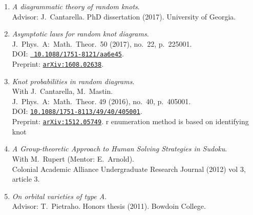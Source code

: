 \documentclass[letterpaper]{article}
\begin{document}
\begin{enumerate}
\item \emph{A diagrammatic theory of random knots}. \\
  Advisor: J.\ Cantarella. PhD dissertation (2017). University of Georgia.
\item \emph{Asymptotic laws for random knot diagrams}. \\
  J.\ Phys.\ A:\ Math.\ Theor.\ 50 (2017), no.\ 22, p.\ 225001.\\
  DOI: \href{https://doi.org/10.1088/1751-8121/aa6e45}{\tt
    10.1088/1751-8121/aa6e45}. \\
  Preprint: \href{http://arxiv.org/abs/1608.02638}{\tt arXiv:1608.02638}. 
\item \emph{Knot probabilities in random diagrams}.\\
  With J.\ Cantarella, M.\ Mastin. \\
  J.\ Phys.\ A:\ Math.\ Theor. 49 (2016), no.\ 40, p.\ 405001.\\
  DOI: \href{http://dx.doi.org/10.1088/1751-8113/49/40/405001}{\tt 10.1088/1751-8113/49/40/405001}.\\
  Preprint: \href{http://arxiv.org/abs/1512.05749}{\tt arXiv:1512.05749}. 
  r enumeration method is based on identifying knot
\item \emph{A Group-theoretic Approach to Human Solving Strategies in
  Sudoku}.\\
  With M.\ Rupert (Mentor: E.\ Arnold). \\
  Colonial Academic Alliance Undergraduate Research Journal (2012) vol
  3, article 3.
\item \emph{On orbital varieties of type A}. \\
  Advisor: T.\ Pietraho. Honors thesis (2011). Bowdoin
  College. 
\end{enumerate}
\end{document}
